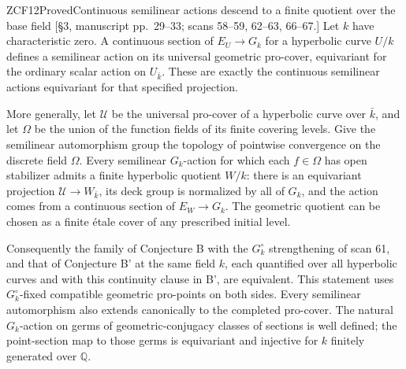 \begin{result}{ZCF12}{Proved}{Continuous semilinear actions descend to a finite quotient over the base field}
\textup{[\S3, manuscript pp.\ 29--33; scans 58--59, 62--63, 66--67.]}
Let $k$ have characteristic zero. A continuous section of
$E_U\to G_k$ for a hyperbolic curve $U/k$ defines a semilinear
action on its universal geometric pro-cover, equivariant for
the ordinary scalar action on $U_{\bar k}$. These are exactly
the continuous semilinear actions equivariant for that specified
projection.

More generally, let $\mathcal U$ be the universal pro-cover of
a hyperbolic curve over $\bar k$, and let $\Omega$ be the union
of the function fields of its finite covering levels. Give the
semilinear automorphism group the topology of pointwise convergence
on the discrete field $\Omega$. Every semilinear $G_k$-action
for which each $f\in\Omega$ has open stabilizer admits a finite
hyperbolic quotient $W/k$: there is an equivariant projection
$\mathcal U\to W_{\bar k}$, its deck group is normalized by
all of $G_k$, and the action comes from a continuous section of
$E_W\to G_k$. The geometric quotient can be chosen as a finite
\'etale cover of any prescribed initial level.

Consequently the family of Conjecture B with the $G_k^\circ$
strengthening of scan 61, and that of Conjecture B' at the same
field $k$, each quantified over all hyperbolic curves and with
this continuity clause in B', are equivalent. This statement
uses $G_k^\circ$-fixed compatible geometric pro-points on both
sides. Every semilinear
automorphism also extends canonically to the completed pro-cover.
The natural $G_k$-action on germs of geometric-conjugacy classes
of sections is well defined; the point-section map to those germs
is equivariant and injective for $k$ finitely generated over
$\mathbb Q$.
\end{result}
